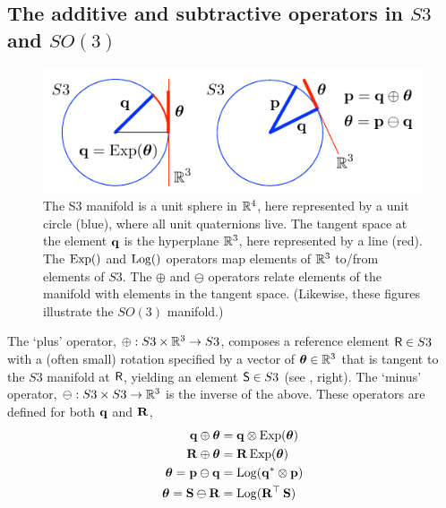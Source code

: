 


\subsection{The additive and subtractive operators in $S3$ and $SO(3)$}

\begin{figure}[tb]
\begin{center}
\includegraphics{figures/manifold}
\caption{The S3 manifold is a unit sphere in ${\mathbb R}^4$, here represented by a unit circle (blue),  where all unit quaternions live. The tangent space at the element ${\bf q}$ is the hyperplane ${\mathbb R}^3$, here represented by a line (red). The $\operatorname*{Exp}()$ and $\operatorname*{Log}()$ operators map elements of ${\mathbb R}^3$ to/from elements of $S3$. The $\oplus$ and $\ominus$ operators relate elements of the manifold with elements in the tangent space. (Likewise, these figures illustrate the $SO(3)$ manifold.)}
\label{fig:manifold}
\end{center}
\end{figure}




The `plus' operator, $\oplus:S3\times{\mathbb R}^3\to S3$, composes a reference element $\mathsf R\in S3$ with a (often small) rotation specified by a vector of ${{\bm \theta}}\in{\mathbb R}^3$ that is tangent to the $S3$ manifold at $\mathsf R$, yielding an element $\mathsf S\in S3$ (see , right). 
%
%
The `minus' operator, $\ominus:S3\times S3\to{\mathbb R}^3$ is the inverse of the above.
%
%
These operators are defined for both ${\bf q}$ and ${\bf R}$,
%
\begin{align}
{\bf q}\oplus{{\bm \theta}}  &= {\bf q}\otimes\operatorname*{Exp}({{\bm \theta}}) \\
{\bf R}\oplus {{\bm \theta}} &= {\bf R}\operatorname*{Exp}({{\bm \theta}}) \\
{{\bm \theta}} = {\bf p}\ominus{\bf q} &= \operatorname*{Log}({\bf q}^*\otimes{\bf p}) \\
{{\bm \theta}} = {\bf S}\ominus{\bf R} &= \operatorname*{Log}({\bf R}^{\top}\,{\bf S})                         
\end{align}


